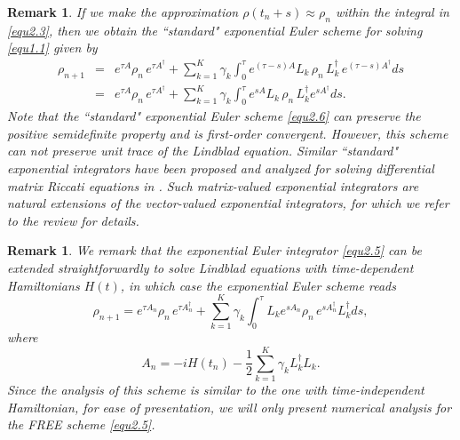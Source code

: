 \documentclass[preprint,3p,compress,12pt]{elsarticle}
\numberwithin{equation}{section}
\newtheorem{rem}[theorem]{Remark}
\numberwithin{figure}{section}
\begin{document}
\begin{rem}
  If we make the approximation $\rho(t_n+s)\approx \rho_n$ within the integral in \eqref{equ2.3}, then we obtain the ``standard" exponential Euler scheme for solving \eqref{equ1.1} given by
  \begin{eqnarray}\label{equ2.6}
\rho_{n+1}&=&e^{\tau A}\rho_n \, e^{\tau A^{\dag}}+\sum_{k=1}^K\gamma_k\int_0^{\tau}e^{(\tau-s)A}L_k \, \rho_n \, L_k^{\dag} \, e^{(\tau-s)A^{\dag}}ds \nonumber\\
&=&e^{\tau A}\rho_n \, e^{\tau A^{\dag}}+\sum_{k=1}^K\gamma_k\int_0^{\tau}e^{sA}L_k \, \rho_n \, L_k^{\dag}e^{sA^{\dag}}ds.
  \end{eqnarray}
Note that the ``standard" exponential Euler scheme \eqref{equ2.6} can preserve the positive semidefinite property and is first-order convergent. However, this scheme can not preserve unit trace of the Lindblad equation. Similar ``standard" exponential integrators have been proposed and analyzed for solving differential matrix Riccati equations in \cite{Chen1,Chen2}. Such matrix-valued exponential integrators are natural extensions of the vector-valued exponential integrators, for which we refer to the review \cite{Hochbruck} for details.
\end{rem}

\begin{rem}
  We remark that the exponential Euler integrator \eqref{equ2.5} can be extended straightforwardly to solve Lindblad equations with time-dependent Hamiltonians $H(t)$, in which case the exponential Euler scheme reads
   \begin{equation}\label{equ2.6b}
  \rho_{n+1}=e^{\tau A_n} \rho_n \, e^{\tau A_n^{\dag}}+\sum_{k=1}^K\gamma_k
  \int_0^{\tau}L_ke^{sA_n}\rho_n \, e^{sA_n^{\dag}} L_k^{\dag}ds,
\end{equation}
where
\begin{equation*}
  A_n=-iH(t_n)-\frac{1}{2}\sum_{k=1}^K\gamma_kL_k^{\dag}L_k.
\end{equation*}
Since the analysis of this scheme is similar to the one with time-independent Hamiltonian, for ease of presentation, we will only present numerical analysis for the FREE scheme \eqref{equ2.5}.
\end{rem}
\end{document}
